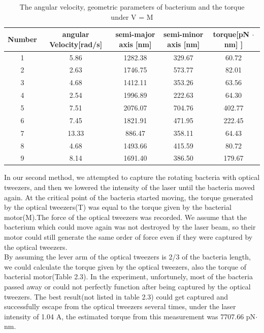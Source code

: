 \documentclass[a4paper,english,12pt,bibliography=totoc]{scrreprt}
\begin{document}
\begin{table}[H]
    \centering
    \begin{tabular}{|c|c|c|c|c|}
    \hline
         Number&angular Velocity[rad/s]& semi-major axis [nm]&semi-minor axis [nm]& torque[pN $\cdot$ nm] ]\\
         \hline
         1&5.86 &1282.38 &329.67 &60.72 \\ 
         \hline
         2&2.63 &1746.75 &573.77 &82.01 \\ 
         \hline
         3&4.68 &1412.11 &353.26 &63.56 \\
         \hline
         4&2.54 &1996.89 &222.63 &64.30 \\ 
         \hline
         5&7.51 &2076.07 &704.76 &402.77 \\ 
         \hline
         6&7.45 &1821.91 &471.95 &222.45 \\ 
         \hline
         7&13.33&886.47  &358.11 &64.43 \\ 
         \hline
         8&4.68 &1493.66 &415.59 &80.72 \\ 
         \hline
         9&8.14 &1691.40 &386.50 &179.67 \\ 
         \hline
    \end{tabular}
    \caption{The angular velocity, geometric parameters of bacterium and the torque \\under V = M}
    \label{tab:my_label}
\end{table}

In our second method, we attempted to capture the rotating bacteria with optical tweezers, and then we lowered the intensity of the laser until the bacteria moved again. At the critical point of the bacteria started moving, the torque generated by the optical tweezers(T) was equal to the torque given by the bacterial motor(M).The force of the optical tweezers was recorded. We assume that the bacterium which could move again was not destroyed by the laser beam, so their motor could still generate the same order of force even if they were captured by the optical tweezers. \\

By assuming the lever arm of the optical tweezers is 2/3 of the bacteria length, we could calculate the torque given by the optical tweezers, also the torque of bacterial motor(Table 2.3). In the experiment, unfortunely, most of the bacteria passed away or could not perfectly function after being captured by the optical tweezers. The best result(not listed in table 2.3) could get captured and successfully escape from the optical tweezers several times, under the laser intensity of 1.04 A, the estimated torque from this measurement was 7707.66 pN$\cdot$ nm.
\end{document}
